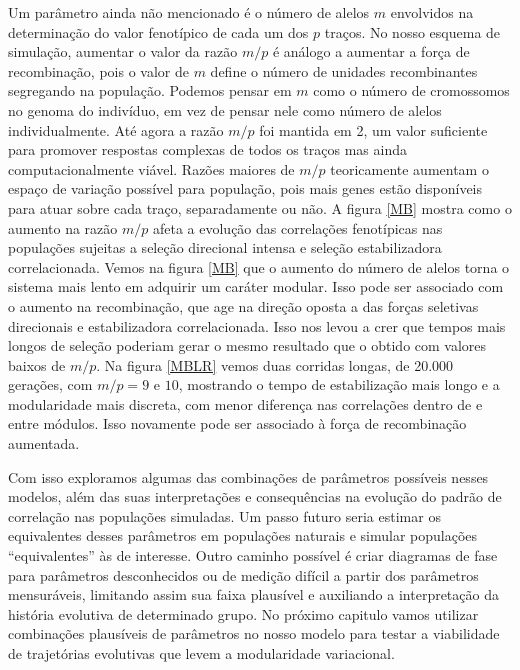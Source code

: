 Um parâmetro ainda não mencionado é o número de alelos $m$ envolvidos na
determinação do valor fenotípico de cada um dos $p$ traços. 
No nosso esquema de simulação, aumentar o valor da razão $m/p$ é análogo
a aumentar a força de recombinação, pois o valor de $m$ define o número
de unidades recombinantes segregando na população. 
Podemos pensar em $m$ como o número de cromossomos no genoma do
indivíduo, em vez de pensar nele como número de alelos individualmente. 
Até agora a razão $m/p$ foi mantida em 2, um valor suficiente para
promover respostas complexas de todos os traços mas ainda
computacionalmente viável. 
Razões maiores de $m/p$ teoricamente aumentam o espaço de variação
possível para população, pois mais genes estão disponíveis para atuar
sobre cada traço, separadamente ou não. 
A figura \ref{MB} mostra como o aumento na razão $m/p$ afeta a evolução
das correlações fenotípicas nas populações sujeitas a seleção direcional
intensa e seleção estabilizadora correlacionada. 
Vemos na figura \ref{MB} que o aumento do número de alelos torna o
sistema mais lento em adquirir um caráter modular. 
Isso pode ser associado com o aumento na recombinação, que age na
direção oposta a das forças seletivas direcionais e estabilizadora
correlacionada. 
Isso nos levou a crer que tempos mais longos de seleção poderiam gerar o
mesmo resultado que o obtido com valores baixos de $m/p$. 
Na figura \ref{MBLR} vemos duas corridas longas, de 20.000 gerações, com
$m/p = 9$ e $10$, mostrando o tempo de estabilização mais longo e a
modularidade mais discreta, com menor diferença nas correlações dentro
de e entre módulos. 
Isso novamente pode ser associado à força de recombinação aumentada. 

Com isso exploramos algumas das combinações de parâmetros possíveis
nesses modelos, além das suas interpretações e consequências na evolução
do padrão de correlação nas populações simuladas. 
Um passo futuro seria estimar os equivalentes desses parâmetros em
populações naturais e simular populações ``equivalentes'' às de
interesse. 
Outro caminho possível é criar diagramas de fase para parâmetros
desconhecidos ou de medição difícil a partir dos parâmetros mensuráveis, 
limitando assim sua faixa plausível e auxiliando a interpretação da
história evolutiva de determinado grupo. 
No próximo capitulo vamos utilizar combinações plausíveis de parâmetros
no nosso modelo para testar a viabilidade de trajetórias evolutivas que
levem a modularidade variacional. 

